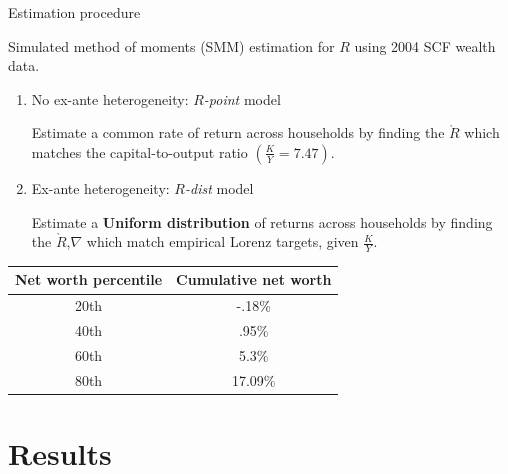 \documentclass{beamer}
\begin{document}
\begin{frame}{Estimation procedure}


Simulated method of moments (SMM) estimation for $R$ using 2004 SCF wealth data.

  \begin{enumerate}
  \item No ex-ante heterogeneity: $R$\textit{-point} model
  \par Estimate a common rate of return across households by finding the $\grave{R}$ which matches the capital-to-output ratio $(\frac{K}{Y} = 7.47)$.
  \vspace{2.5mm}

  \item Ex-ante heterogeneity: $R$\textit{-dist} model
  \par Estimate  a \textbf{Uniform distribution} of returns across households by finding the $\grave{R}$,$\nabla$ which match empirical Lorenz targets, given $\frac{K}{Y}$.
  \end{enumerate}
  
  \centering
  \small
  \begin{tabular}{|c|c|}
\hline
Net worth percentile & Cumulative net worth \\
\hline
20th & -.18\%  \\
40th &  .95\% \\
60th &  5.3\% \\
80th &  17.09\% \\
\hline
\end{tabular}


\end{frame}

\section{Results}
\end{document}
